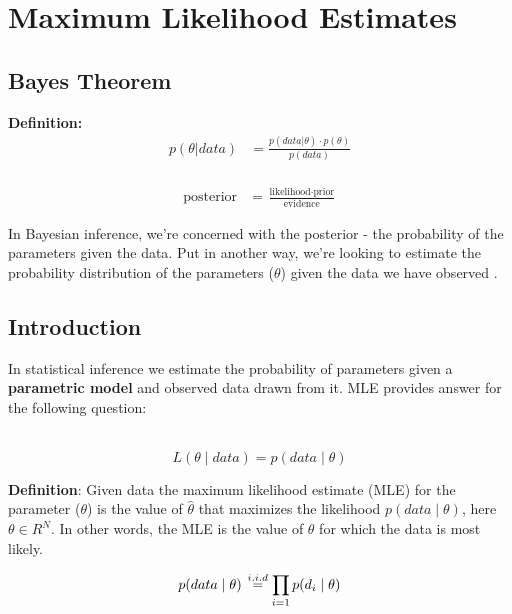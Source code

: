 \chapter{Maximum Likelihood Estimates}

\section{Bayes Theorem}

\textbf{Definition:}
\begin{equation}
\begin{split}
    p(\theta | data) & = \frac{p(data | \theta) \cdot p(\theta)}{p(data)} \\
\end{split}
\end{equation}

\begin{align*}
    \text{posterior} &= \frac{\text{likelihood} \cdot \text{prior}}{\text{evidence}}
\end{align*}

In Bayesian inference, we're concerned with the posterior - the probability of the parameters given the data. Put in another way, we're looking to estimate the probability distribution of the parameters ($\theta$) given the data we have observed \cite{reg}. 


\section{Introduction}

In statistical inference we estimate the probability of parameters given a \textbf{parametric model}\cite{param_model} and observed data drawn from it. MLE provides answer for the following question: 

 \cite{mit} \\

\begin{equation}
    L(\theta \mid data) = p(data \mid \theta)
\end{equation}

\noindent\textbf{Definition}: Given data the maximum likelihood estimate (MLE) for the parameter ($\theta$) is
the value of $\hat{\theta}$ that maximizes the likelihood $ p(data \mid \theta)$, here $\theta \in R^N$. In other words, the MLE is the value of $\theta$ for which the data is most likely.

\begin{equation}
    p(data \mid \theta) \hspace{0.5mm} \overset{i.i.d}{=} \prod_{i=1} p(d_i \mid \theta)
\end{equation}


